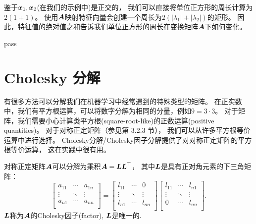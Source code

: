 鉴于$\boldsymbol{x}_1,\boldsymbol{x}_2$(在我们的示例中)是正交的，
我们可以直接将单位正方形的周长计算为$2(1 + 1)$。
使用$\boldsymbol{A}$映射特征向量会创建一个周长为$2(|\lambda_1 | + |\lambda_2|)$的矩形。
因此，特征值的绝对值之和告诉我们单位正方形的周长在变换矩阵$\boldsymbol{A}$下如何变化。

\begin{example}
    pass
\end{example}

\section{Cholesky 分解}

有很多方法可以分解我们在机器学习中经常遇到的特殊类型的矩阵。
在正实数中，我们有平方根运算，可以将数字分解为相同的分量，例如$9 = 3 · 3$。
对于矩阵，我们需要小心计算类平方根(square-root-like)的正数运算(positive quantities)。
对于对称正定矩阵（参见第 3.2.3 节），
我们可以从许多平方根等价运算中进行选择。
Cholesky分解/Cholesky因子分解提供了对对称正定矩阵的平方根等价运算，
这在实践中很有用。

\begin{theorem}[Cholesky 分解]
    对称正定矩阵$\boldsymbol{A}$可以分解为乘积$\boldsymbol{A} = \boldsymbol{L}\boldsymbol{L}^\top$，
    其中$\boldsymbol{L}$是具有正对角元素的下三角矩阵：
    \begin{equation}
        \begin{bmatrix}
            a_{11} & \cdots & a_{1n} \\
            \vdots & \ddots & \vdots \\
            a_{n1} & \cdots & a_{nn} \\
        \end{bmatrix} =
        \begin{bmatrix}
            l_{11} & \cdots & 0 \\
            \vdots & \ddots & \vdots \\
            l_{n1} & \cdots & l_{nn} \\
        \end{bmatrix}
        \begin{bmatrix}
            l_{11} & \cdots & l_{n1} \\
            \vdots & \ddots & \vdots \\
            0 & \cdots & l_{nn} \\
        \end{bmatrix}.
    \end{equation}
    $\boldsymbol{L}$称为$\boldsymbol{A}$的Cholesky因子(factor), $\boldsymbol{L}$是唯一的.
\end{theorem}


